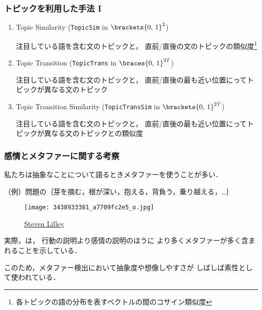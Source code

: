 \documentclass[11pt,usepdftitle=false]{beamer}
\let\oldcite=\citet
\renewcommand\citet[1]{\hyperlink{#1}{\oldcite{#1}}}
\let\oldcitep=\citep
\renewcommand\citep[1]{\hyperlink{#1}{\oldcitep{#1}}}
\begin{document}
\begin{frame}
\frametitle{トピックを利用した手法 I}
\begin{enumerate}
    \addtocounter{enumi}{2}
    \item Topic Similarity (\texttt{TopicSim} in $\brackets{0,\,1}^2$)

        注目している語を含む文のトピックと，
        直前/直後の文のトピックの類似度\footnote{各トピックの語の分布を表すベクトルの間のコサイン類似度}
    \item Topic Transition (\texttt{TopicTrans} in $\braces{0,\,1}^{2T}$)

        注目している語を含む文のトピックと，
        直前/直後の最も近い位置にってトピックが異なる文のトピック

    \item Topic Transition Similarity (\texttt{TopicTransSim} in $\brackets{0,\,1}^{2T}$)

        注目している語を含む文のトピックと，
        直前/直後の最も近い位置にってトピックが異なる文のトピックとの類似度
\end{enumerate}
\end{frame}

\begin{frame}
    \frametitle{感情とメタファーに関する考察}

    私たちは抽象なことについて語るときメタファーを使うことが多い．

    （例）問題の｛芽を摘む，根が深い，抱える，背負う，乗り越える，…｝
    \begin{wrapfigure}[6]{r}{0.28\linewidth}
    \centering
    \texttt{[image: 3438933381\_a7709fc2e5\_o.jpg]}
    \captionsetup{font=scriptsize}
    \caption*{\href{https://www.flickr.com/photos/sk8geek/3438933381/in/photolist-6eTr5R-WmG5-dvtenR-6cuu94-8xZB1p-z7hin-feLn6-gJqK3u-CvRsA-bAZab-bqoGk3-6TE4wm-FEbrC-4Rz1vp-7FjaiM-FrVkX-4Mokdp-6HZjQ-bJHRC-mEztZ6-bDcEa9-Bf8Fi4-nXnJjP-FU7p9d-c3WdmA-Hznn3o-bE3vd1-c3WKi1-mwEAoY-6aJYqq-HTH9WN-681vjS-96dxWt-pZ7aEX-8PWJN6-mWMcHj-8vqmsZ-bthub-4FNsYi-CLAfW-FfyUD-EMPcSw-9GuygY-3Wqy5-81e4FX-nyzN52-8hQzRq-rnAGnQ-8kxzES-4M3xYz}{\raisebox{-0.8pt}{\copyright} Steven Lilley}}
    \end{wrapfigure}

    実際，\citet{fainsilber1987}は，
    行動の説明より感情の説明のほうに
    より多くメタファーが多く含まれることを示している．

    \bigskip

    このため，メタファー検出において抽象度や想像しやすさが
    しばしば素性として使われている\citep{tsvetkov2014,broadwell2013}．
\end{frame}
\end{document}
